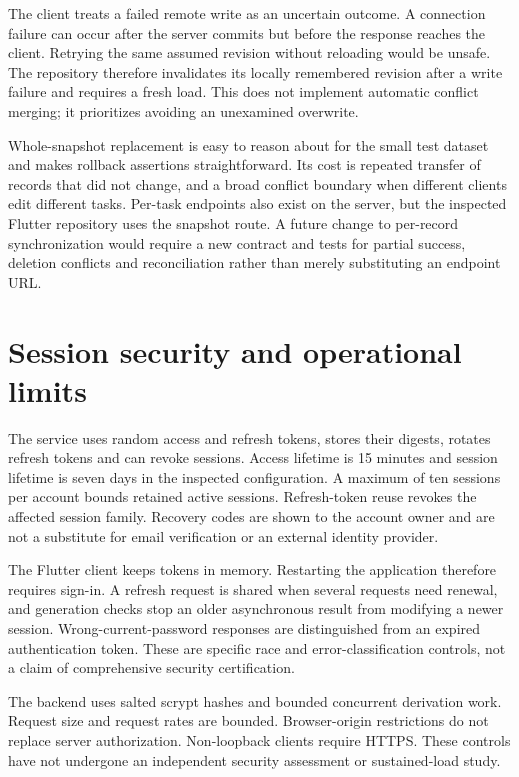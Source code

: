 \documentclass[12pt,a4paper,oneside]{report}
\begin{document}
The client treats a failed remote write as an uncertain outcome. A connection failure can occur after the server commits but before the response reaches the client. Retrying the same assumed revision without reloading would be unsafe. The repository therefore invalidates its locally remembered revision after a write failure and requires a fresh load. This does not implement automatic conflict merging; it prioritizes avoiding an unexamined overwrite.

Whole-snapshot replacement is easy to reason about for the small test dataset and makes rollback assertions straightforward. Its cost is repeated transfer of records that did not change, and a broad conflict boundary when different clients edit different tasks. Per-task endpoints also exist on the server, but the inspected Flutter repository uses the snapshot route. A future change to per-record synchronization would require a new contract and tests for partial success, deletion conflicts and reconciliation rather than merely substituting an endpoint URL.

\section{Session security and operational limits}
The service uses random access and refresh tokens, stores their digests, rotates refresh tokens and can revoke sessions. Access lifetime is 15 minutes and session lifetime is seven days in the inspected configuration. A maximum of ten sessions per account bounds retained active sessions. Refresh-token reuse revokes the affected session family. Recovery codes are shown to the account owner and are not a substitute for email verification or an external identity provider.

The Flutter client keeps tokens in memory. Restarting the application therefore requires sign-in. A refresh request is shared when several requests need renewal, and generation checks stop an older asynchronous result from modifying a newer session. Wrong-current-password responses are distinguished from an expired authentication token. These are specific race and error-classification controls, not a claim of comprehensive security certification.

The backend uses salted scrypt hashes and bounded concurrent derivation work. Request size and request rates are bounded. Browser-origin restrictions do not replace server authorization. Non-loopback clients require HTTPS. These controls have not undergone an independent security assessment or sustained-load study.
\end{document}
